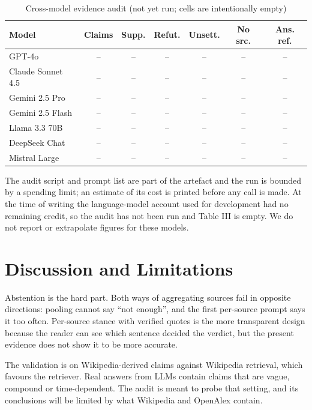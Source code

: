 \documentclass[conference]{IEEEtran}
\begin{document}
\begin{table}[t]
\caption{Cross-model evidence audit (not yet run; cells are intentionally empty)}
\centering
\footnotesize
\begin{tabular}{lcccccc}
\toprule
Model & Claims & Supp. & Refut. & Unsett. & No src. & Ans. ref. \\
\midrule
GPT-4o & -- & -- & -- & -- & -- & -- \\
Claude Sonnet 4.5 & -- & -- & -- & -- & -- & -- \\
Gemini 2.5 Pro & -- & -- & -- & -- & -- & -- \\
Gemini 2.5 Flash & -- & -- & -- & -- & -- & -- \\
Llama 3.3 70B & -- & -- & -- & -- & -- & -- \\
DeepSeek Chat & -- & -- & -- & -- & -- & -- \\
Mistral Large & -- & -- & -- & -- & -- & -- \\
\bottomrule
\end{tabular}
\par\vspace{2pt}{\scriptsize Produced by scripts/eval\_llm\_responses.py. Rates are shares of each model's checked claims; the last column is the share of answers with at least one refuted claim.}
\end{table}

The audit script and prompt list are part of the artefact and the run is bounded by a spending limit; an estimate of its cost is printed before any call is made. At the time of writing the language-model account used for development had no remaining credit, so the audit has not been run and Table III is empty. We do not report or extrapolate figures for these models.

\section{Discussion and Limitations}
Abstention is the hard part. Both ways of aggregating sources fail in opposite directions: pooling cannot say ``not enough'', and the first per-source prompt says it too often. Per-source stance with verified quotes is the more transparent design because the reader can see which sentence decided the verdict, but the present evidence does not show it to be more accurate.

The validation is on Wikipedia-derived claims against Wikipedia retrieval, which favours the retriever. Real answers from LLMs contain claims that are vague, compound or time-dependent. The audit is meant to probe that setting, and its conclusions will be limited by what Wikipedia and OpenAlex contain.
\end{document}
